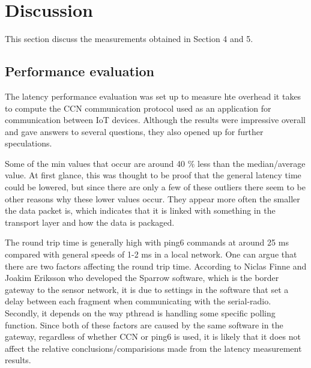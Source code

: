 \section{Discussion}
This section discuss the measurements obtained in Section 4 and 5. %

\subsection{Performance evaluation}
The latency performance evaluation was set up to measure hte overhead it takes to compute the CCN communication protocol used as an application for communication between IoT devices. Although the results were impressive overall and gave answers to several questions, they also opened up for further speculations.

Some of the min values that occur are around 40 $\%$ less than the median/average value. At first glance, this was thought to be proof that the general latency time could be lowered, but since there are only a few of these outliers there seem to be other reasons why these lower values occur. They appear more often the smaller the data packet is, which indicates that it is linked with something in the transport layer and how the data is packaged.
%

The round trip time is generally high with ping6 commands at around 25 ms compared with general speeds of 1-2 ms in a local network. One can argue that there are two factors affecting the round trip time. According to Niclas Finne and Joakim Eriksson who developed the Sparrow software, which is the border gateway to the sensor network, it is due to settings in the software that set a delay between each fragment when communicating with the serial-radio. Secondly, it depends on the way pthread is handling some specific polling function. Since both of these factors are caused by the same software in the gateway, regardless of whether CCN or ping6 is used, it is likely that it does not affect the relative conclusions/comparisions made from the latency measurement results.


